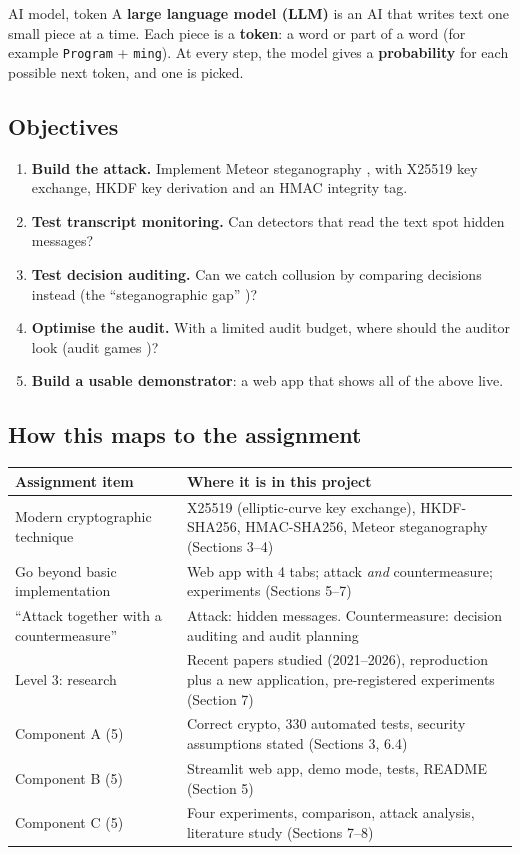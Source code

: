\documentclass[11pt,a4paper]{article}
\begin{document}
\begin{plain}{AI model, token}
A \textbf{large language model (LLM)} is an AI that writes text one small piece at a time.
Each piece is a \textbf{token}: a word or part of a word (for example \texttt{Program} + \texttt{ming}).
At every step, the model gives a \textbf{probability} for each possible next token, and one is picked.
\end{plain}

\subsection{Objectives}
\begin{enumerate}
  \item \textbf{Build the attack.} Implement Meteor steganography \cite{kaptchuk2021}, with X25519 key exchange, HKDF key derivation and an HMAC integrity tag.
  \item \textbf{Test transcript monitoring.} Can detectors that read the text spot hidden messages?
  \item \textbf{Test decision auditing.} Can we catch collusion by comparing decisions instead (the ``steganographic gap'' \cite{anwar2026})?
  \item \textbf{Optimise the audit.} With a limited audit budget, where should the auditor look (audit games \cite{blocki2013})?
  \item \textbf{Build a usable demonstrator}: a web app that shows all of the above live.
\end{enumerate}

\subsection{How this maps to the assignment}
\begin{center}
\begin{tabularx}{\linewidth}{lX}
\toprule
\textbf{Assignment item} & \textbf{Where it is in this project}\\
\midrule
Modern cryptographic technique & X25519 (elliptic-curve key exchange), HKDF-SHA256, HMAC-SHA256, Meteor steganography (Sections 3--4)\\
Go beyond basic implementation & Web app with 4 tabs; attack \emph{and} countermeasure; experiments (Sections 5--7)\\
``Attack together with a countermeasure'' & Attack: hidden messages. Countermeasure: decision auditing and audit planning\\
Level 3: research & Recent papers studied (2021--2026), reproduction plus a new application, pre-registered experiments (Section 7)\\
Component A (5) & Correct crypto, 330 automated tests, security assumptions stated (Sections 3, 6.4)\\
Component B (5) & Streamlit web app, demo mode, tests, README (Section 5)\\
Component C (5) & Four experiments, comparison, attack analysis, literature study (Sections 7--8)\\
\bottomrule
\end{tabularx}
\end{center}
\end{document}
